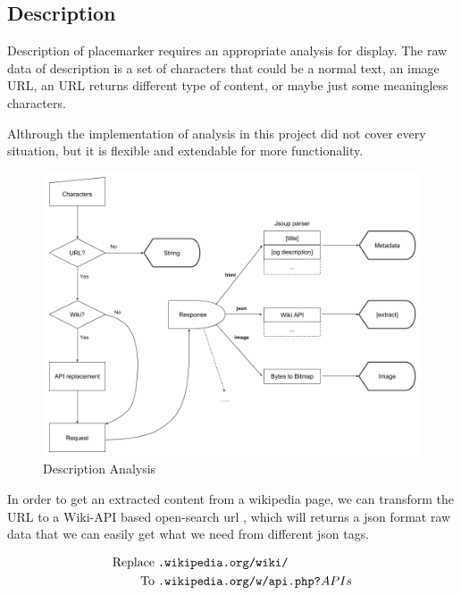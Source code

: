 \subsection{Description}

Description of placemarker requires an appropriate analysis for display. The raw data of description is a set of characters that could be a normal text, an image URL, an URL returns different type of content, or maybe just some meaningless characters.

Althrough the implementation of analysis in this project did not cover every situation, but it is flexible and extendable for more functionality.

\begin{figure}[H]
\caption[description-analysis]{Description Analysis}
\label{fig:description-analysis}
\centering
\includegraphics[width=\linewidth]{Figures/description-analysis.png}
\decoRule
\end{figure}

In order to get an extracted content from a wikipedia page, we can transform the URL to a Wiki-API based open-search url \parencite{wiki.api.2016}, which will returns a json format raw data that we can easily get what we need from different json tags.

\[
\begin{array}{lr}
\begin{aligned}
\text{Replace}\;&\texttt{.wikipedia.org/wiki/}\\
\text{To}\;&\texttt{.wikipedia.org/w/api.php?}APIs\\
\end{aligned}
\end{array}
\]

